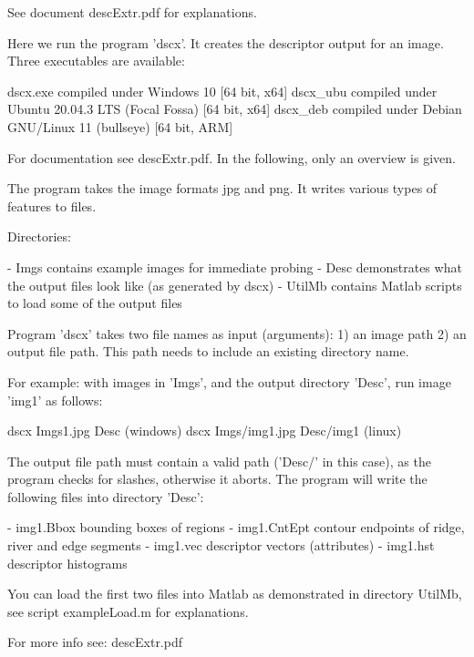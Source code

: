 See document descExtr.pdf for explanations.

Here we run the program 'dscx'. It creates the descriptor output for an image. Three
executables are available:

dscx.exe    compiled under Windows 10                       [64 bit, x64]
dscx_ubu    compiled under Ubuntu 20.04.3 LTS (Focal Fossa) [64 bit, x64]
dscx_deb    compiled under Debian GNU/Linux 11 (bullseye)   [64 bit, ARM]

For documentation see descExtr.pdf. In the following, only an overview is given.

The program takes the image formats jpg and png. It writes various types of features
to files.

Directories: 

- Imgs	 contains example images for immediate probing
- Desc   demonstrates what the output files look like (as generated by dscx) 
- UtilMb contains Matlab scripts to load some of the output files

Program 'dscx' takes two file names as input (arguments):
   1) an image path
   2) an output file path. This path needs to include an existing directory name.

For example: with images in 'Imgs', and the output directory 'Desc', run image 'img1'
as follows:

   dscx Imgs\img1.jpg Desc	   (windows)
   dscx Imgs/img1.jpg Desc/img1	   (linux)

The output file path must contain a valid path ('Desc/' in this case), as the
program checks for slashes, otherwise it aborts. The program will write the
following files into directory 'Desc':

    - img1.Bbox	    bounding boxes of regions
    - img1.CntEpt   contour endpoints of ridge, river and edge segments 
    - img1.vec	    descriptor vectors (attributes)
    - img1.hst	    descriptor histograms

You can load the first two files into Matlab as demonstrated in directory UtilMb,
see script exampleLoad.m for explanations.

For more info see: descExtr.pdf


